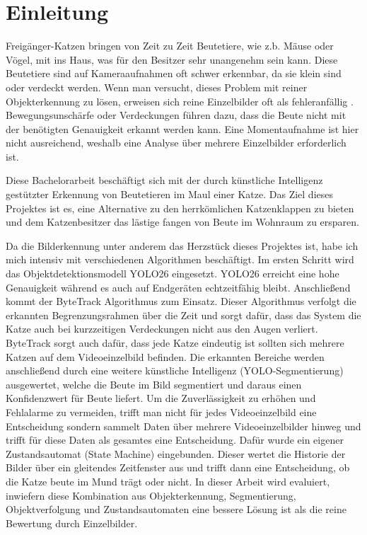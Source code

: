 \chapter{Einleitung}
\label{sec:einleitung}

Freigänger-Katzen bringen von Zeit zu Zeit Beutetiere, wie z.b. Mäuse oder Vögel, mit ins Haus, was für den Besitzer sehr unangenehm sein kann. Diese Beutetiere sind auf Kameraaufnahmen oft schwer erkennbar, da sie klein sind oder verdeckt werden. Wenn man versucht, dieses Problem mit reiner Objekterkennung zu lösen, erweisen sich reine Einzelbilder oft als fehleranfällig \cite{jiao2022video}. Bewegungsunschärfe oder Verdeckungen führen dazu, dass die Beute nicht mit der benötigten Genauigkeit erkannt werden kann. Eine Momentaufnahme ist hier nicht ausreichend, weshalb eine Analyse über mehrere Einzelbilder erforderlich ist.

Diese Bachelorarbeit beschäftigt sich mit der durch künstliche Intelligenz gestützter Erkennung von Beutetieren im Maul einer Katze. Das Ziel dieses Projektes ist es, eine Alternative zu den herrkömlichen Katzenklappen zu bieten und dem Katzenbesitzer das lästige fangen von Beute im Wohnraum zu ersparen.

Da die Bilderkennung unter anderem das Herzstück dieses Projektes ist, habe ich mich intensiv mit verschiedenen Algorithmen beschäftigt. Im ersten Schritt wird das Objektdetektionsmodell YOLO26 \cite{jocher2024yolo} eingesetzt. YOLO26 erreicht eine hohe Genauigkeit während es auch auf Endgeräten echtzeitfähig bleibt. Anschließend kommt der ByteTrack \cite{zhang2022bytetrack} Algorithmus zum Einsatz. Dieser Algorithmus verfolgt die erkannten Begrenzungsrahmen über die Zeit und sorgt dafür, dass das System die Katze auch bei kurzzeitigen Verdeckungen nicht aus den Augen verliert. ByteTrack sorgt auch dafür, dass jede Katze eindeutig ist sollten sich mehrere Katzen auf dem Videoeinzelbild befinden. Die erkannten Bereiche werden anschließend durch eine weitere künstliche Intelligenz (YOLO-Segmentierung) ausgewertet, welche die Beute im Bild segmentiert und daraus einen Konfidenzwert für Beute liefert. Um die Zuverlässigkeit zu erhöhen und Fehlalarme zu vermeiden, trifft man nicht für jedes Videoeinzelbild eine Entscheidung sondern sammelt Daten über mehrere Videoeinzelbilder hinweg und trifft für diese Daten als gesamtes eine Entscheidung. Dafür wurde ein eigener Zustandsautomat (State Machine) eingebunden. Dieser wertet die Historie der Bilder über ein gleitendes Zeitfenster aus und trifft dann eine Entscheidung, ob die Katze beute im Mund trägt oder nicht. In dieser Arbeit wird evaluiert, inwiefern diese Kombination aus Objekterkennung, Segmentierung, Objektverfolgung und Zustandsautomaten eine bessere Lösung ist als die reine Bewertung durch Einzelbilder.

